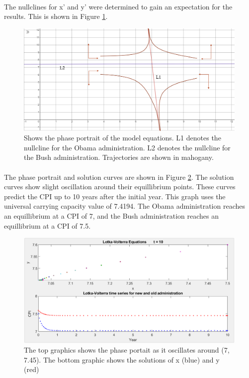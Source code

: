 \documentclass{article}
\begin{document}
	\paragraph{}
	The nullclines for x' and y' were determined to gain an expectation for the results. This is shown in Figure \ref{Phase Portrait}.
	\begin{figure}[h]
	\centering
	\includegraphics[width=1\textwidth]{phase_portrait}
	\caption{Shows the phase portrait of the model equations. L1 denotes the nullcline for the Obama administration. L2 denotes the nullcline for the Bush administration. Trajectories are shown in mahogany.}
	\label{Phase Portrait}
	\end{figure}

	\paragraph{}
	The phase portrait and solution curves are shown in Figure \ref{Solution1}. The solution curves show slight oscillation around their equillibrium points. These curves predict the CPI up to 10 years after the initial year. This graph uses the universal carrying capacity value of 7.4194. The Obama administration reaches an equillibrium at a CPI of 7, and the Bush administration reaches an equillibrium at a CPI of 7.5.
	\begin{figure}[!]
	\centering
	\includegraphics[width=1\textwidth]{solution_universal_k}
	\caption{The top graphics shows the phase portait as it oscillates around (7, 7.45). The bottom graphic shows the solutions of x (blue) and y (red)}
	\label{Solution1}
	\end{figure}
\end{document}
